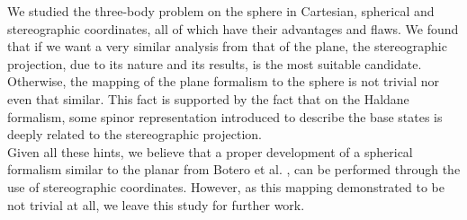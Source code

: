 We studied the three-body problem on the sphere in Cartesian, spherical and stereographic coordinates, all of which have their advantages and flaws. We found that if we want a very similar analysis from that of the plane, the stereographic projection, due to its nature and its results, is the most suitable candidate. Otherwise, the mapping of the plane formalism to the sphere is not trivial nor even that similar.  This fact is supported by the fact that on the Haldane formalism, some spinor representation introduced to describe the base states is deeply related to the stereographic projection.\\

Given all these hints, we believe that a proper development of a spherical formalism similar to the planar from Botero et al. \cite{alonso}, can be performed through the use of stereographic coordinates. However, as this mapping demonstrated to be not trivial at all, we leave this study for further work.\\

